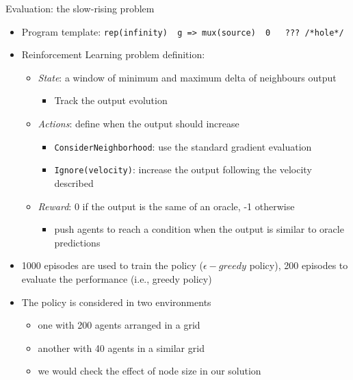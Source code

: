 \documentclass[9pt, aspectratio=169, handout]{beamer}
\begin{document}
\begin{frame}{Evaluation: the slow-rising problem}
\begin{card}
\begin{itemize}
      \item Program template: \texttt{rep(infinity) { g => mux(source) { 0 } { ??? /*hole*/ } }}
      \item Reinforcement Learning problem definition:
      \begin{itemize}
        \item \emph{State}: a window of minimum and maximum delta of neighbours output
        \begin{itemize}
          \item[\faArrowRight] Track the output evolution
        \end{itemize}
        \item \emph{Actions}: define when the output should increase
        \begin{itemize}
          \item[\faArrowRight] \texttt{ConsiderNeighborhood}: use the standard gradient evaluation
          \item[\faArrowRight] \texttt{Ignore(velocity)}: increase the output following the velocity described
        \end{itemize}
        \item \emph{Reward}: 0 if the output is the same of an oracle, -1 otherwise
        \begin{itemize}
          \item[\faArrowRight] push agents to reach a condition when the output is similar to oracle predictions
        \end{itemize}
      \end{itemize}
    \end{itemize}
  \end{card}
\framebreak
  \begin{card}
    \begin{itemize}
      \item 1000 episodes are used to train the policy ($\epsilon-greedy$ policy), 200 episodes to evaluate the performance (i.e., greedy policy)
      \item The policy is considered in two environments 
      \begin{itemize}
        \item one with 200 agents arranged in a grid
        \item another with 40 agents in a similar grid
        \item we would check the effect of node size in our solution
      \end{itemize}

\end{itemize}
\end{card}
\end{frame}
\end{document}
